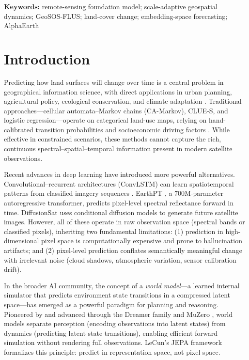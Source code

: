 \documentclass{article}
\newenvironment{keywords}{\par\noindent\textbf{Keywords:} }{\par}%
\begin{document}
\begin{keywords}
remote-sensing foundation model; scale-adaptive geospatial dynamics; GeoSOS-FLUS; land-cover change; embedding-space forecasting; AlphaEarth
\end{keywords}

\section{Introduction}
\label{sec:intro}

Predicting how land surfaces will change over time is a central problem in geographical information science, with direct applications in urban planning, agricultural policy, ecological conservation, and climate adaptation \citep{verburg2004lulc}. Traditional approaches---cellular automata--Markov chains (CA-Markov), CLUE-S, and logistic regression---operate on categorical land-use maps, relying on hand-calibrated transition probabilities and socioeconomic driving factors \citep{veldkamp2004clues}. While effective in constrained scenarios, these methods cannot capture the rich, continuous spectral--spatial--temporal information present in modern satellite observations.

Recent advances in deep learning have introduced more powerful alternatives. Convolutional--recurrent architectures (ConvLSTM) can learn spatiotemporal patterns from classified imagery sequences \citep{shi2015convlstm}. EarthPT \citep{smith2023earthpt}, a 700M-parameter autoregressive transformer, predicts pixel-level spectral reflectance forward in time. DiffusionSat \citep{khanna2023diffusionsat} uses conditional diffusion models to generate future satellite images. However, all of these operate in raw observation space (spectral bands or classified pixels), inheriting two fundamental limitations: (1) prediction in high-dimensional pixel space is computationally expensive and prone to hallucination artifacts; and (2) pixel-level prediction conflates semantically meaningful change with irrelevant noise (cloud shadows, atmospheric variation, sensor calibration drift).

In the broader AI community, the concept of a \textit{world model}---a learned internal simulator that predicts environment state transitions in a compressed latent space---has emerged as a powerful paradigm for planning and reasoning. Pioneered by \citet{ha2018world} and advanced through the Dreamer family \citep{hafner2023dreamerv3} and MuZero \citep{schrittwieser2020muzero}, world models separate perception (encoding observations into latent states) from dynamics (predicting latent state transitions), enabling efficient forward simulation without rendering full observations. LeCun's JEPA framework \citep{lecun2022jepa} formalizes this principle: predict in representation space, not pixel space.
\end{document}

